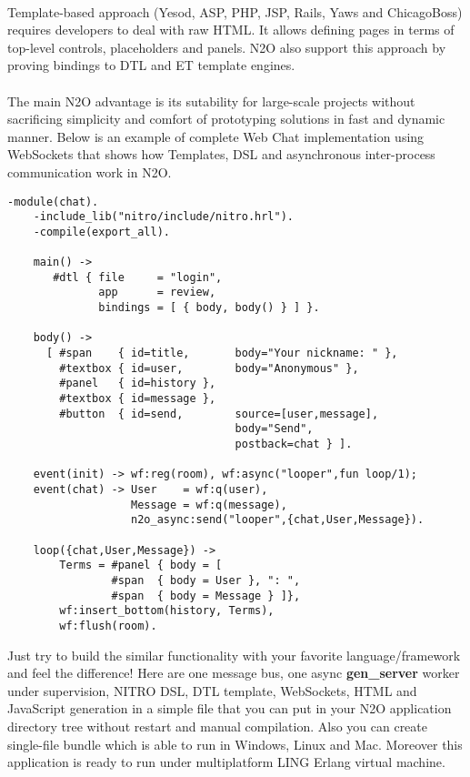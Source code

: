 \paragraph{}
Template-based approach (Yesod, ASP, PHP, JSP, Rails, Yaws and ChicagoBoss)
requires developers to deal with raw HTML. It allows
defining pages in terms of top-level controls, placeholders
and panels. N2O also support this approach by proving bindings
to DTL and ET template engines.

\paragraph{}
The main N2O advantage is its sutability for large-scale projects
without sacrificing simplicity and comfort of prototyping solutions
in fast and dynamic manner. Below is an example of complete Web Chat
implementation using WebSockets that shows how  Templates, DSL and
asynchronous inter-process communication work in N2O.

\newpage
\vspace{1\baselineskip}
\begin{lstlisting}[caption=chat.erl]
    -module(chat).
    -include_lib("nitro/include/nitro.hrl").
    -compile(export_all).

    main() ->
       #dtl { file     = "login",
              app      = review,
              bindings = [ { body, body() } ] }.

    body() ->
      [ #span    { id=title,       body="Your nickname: " },
        #textbox { id=user,        body="Anonymous" },
        #panel   { id=history },
        #textbox { id=message },
        #button  { id=send,        source=[user,message],
                                   body="Send",
                                   postback=chat } ].

    event(init) -> wf:reg(room), wf:async("looper",fun loop/1);
    event(chat) -> User    = wf:q(user),
                   Message = wf:q(message),
                   n2o_async:send("looper",{chat,User,Message}).

    loop({chat,User,Message}) ->
        Terms = #panel { body = [
                #span  { body = User }, ": ",
                #span  { body = Message } ]},
        wf:insert_bottom(history, Terms),
        wf:flush(room).
\end{lstlisting}
\vspace{1\baselineskip}

Just try to build the similar functionality with your favorite
language/framework and feel the difference! Here are one message bus,
one async {\bf gen\_server} worker under supervision, NITRO DSL, DTL template,
WebSockets, HTML and JavaScript generation in a simple file that you can
put in your N2O application directory tree without restart and
manual compilation. Also you can create single-file bundle
which is able to run in Windows, Linux and Mac. Moreover this
application is ready to run under multiplatform LING Erlang virtual machine.

